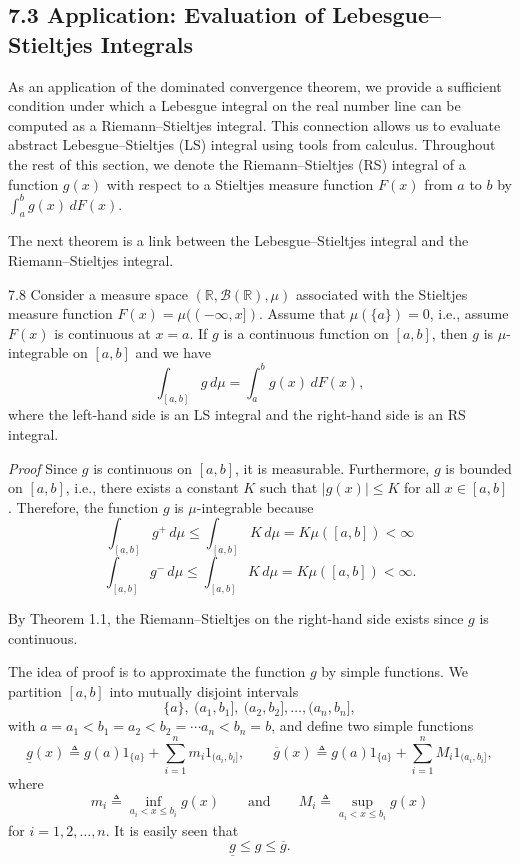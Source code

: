\subsection*{7.3 Application: Evaluation of Lebesgue--Stieltjes Integrals}

As an application of the dominated convergence theorem, we provide a sufficient condition under which a Lebesgue integral on the real number line can be computed as a Riemann--Stieltjes integral. This connection allows us to evaluate abstract Lebesgue--Stieltjes (LS) integral using tools from calculus. Throughout the rest of this section, we denote the Riemann--Stieltjes (RS) integral of a function $g(x)$ with respect to a Stieltjes measure function $F(x)$ from $a$ to $b$ by $\int_a^b g(x)\, dF(x)$.

The next theorem is a link between the Lebesgue--Stieltjes integral and the Riemann--Stieltjes integral.

\begin{thmbox}{7.8}
Consider a measure space $(\mathbb{R},\mathcal{B}(\mathbb{R}),\mu)$ associated with the Stieltjes measure function $F(x)=\mu((-\infty,x])$. Assume that $\mu(\{a\})=0$, i.e., assume $F(x)$ is continuous at $x=a$. If $g$ is a continuous function on $[a,b]$, then $g$ is $\mu$-integrable on $[a,b]$ and we have
\[
\int_{[a,b]} g\, d\mu = \int_a^b g(x)\, dF(x),
\]
where the left-hand side is an LS integral and the right-hand side is an RS integral.
\end{thmbox}

\textit{Proof} Since $g$ is continuous on $[a,b]$, it is measurable. Furthermore, $g$ is bounded on $[a,b]$, i.e., there exists a constant $K$ such that $|g(x)|\le K$ for all $x\in [a,b]$. Therefore, the function $g$ is $\mu$-integrable because
\[
\int_{[a,b]} g^+\, d\mu \le \int_{[a,b]} K\, d\mu = K\mu([a,b])<\infty
\]
\[
\int_{[a,b]} g^-\, d\mu \le \int_{[a,b]} K\, d\mu = K\mu([a,b])<\infty.
\]

By Theorem 1.1, the Riemann--Stieltjes on the right-hand side exists since $g$ is continuous.

The idea of proof is to approximate the function $g$ by simple functions. We partition $[a,b]$ into mutually disjoint intervals
\[
\{a\},\ (a_1,b_1],\ (a_2,b_2],\dots,(a_n,b_n],
\]
with $a=a_1<b_1=a_2<b_2=\cdots a_n<b_n=b$, and define two simple functions
\[
\underline{g}(x)\triangleq g(a)1_{\{a\}}+\sum_{i=1}^{n} m_i 1_{(a_i,b_i]},
\qquad
\overline{g}(x)\triangleq g(a)1_{\{a\}}+\sum_{i=1}^{n} M_i 1_{(a_i,b_i]},
\]
where
\[
m_i \triangleq \inf_{a_i<x\le b_i} g(x)
\qquad \text{and} \qquad
M_i \triangleq \sup_{a_i<x\le b_i} g(x)
\]
for $i=1,2,\dots,n$. It is easily seen that
\[
\underline{g}\le g \le \overline{g}.
\]

